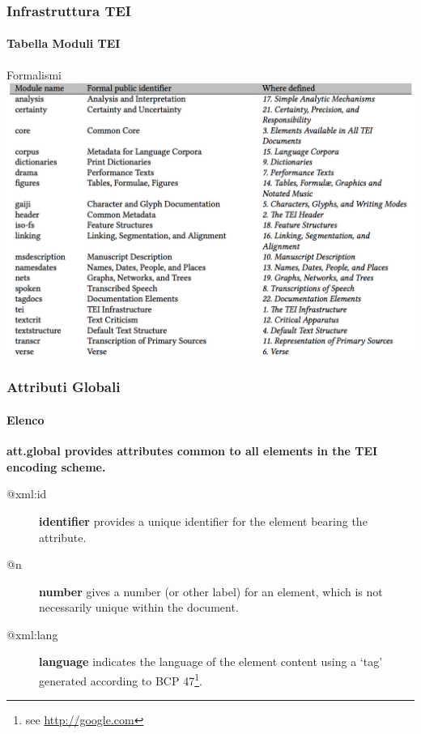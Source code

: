 


\begin{frame}
    \frametitle{Infrastruttura TEI}
    \framesubtitle{Tabella Moduli TEI}
    \addtocounter{nframe}{1}
    
    \begin{block}{Formalismi}
	    \includegraphics[width=.5\textwidth]{imgs/ModuliTEI.png}
    \end{block}
    

\end{frame}

\begin{frame}
    \frametitle{Attributi Globali}
    \framesubtitle{Elenco}
    \addtocounter{nframe}{1}


\textbf{\textrm{att.global} provides attributes common to all elements in the TEI encoding scheme.}

\begin{description}
    \item [@xml:id]     \textbf{identifier} provides a unique identifier for the element bearing the attribute.
    \item [@n]          \textbf{number} gives a number (or other label) for an element, which is not necessarily unique within the document.
    \item [@xml:lang]   \textbf{language} indicates the language of the element content using a ‘tag’ generated according to BCP 47\footnote{see \href{http://google.con}{http://google.com}}.
\end{description}

\end{frame}


